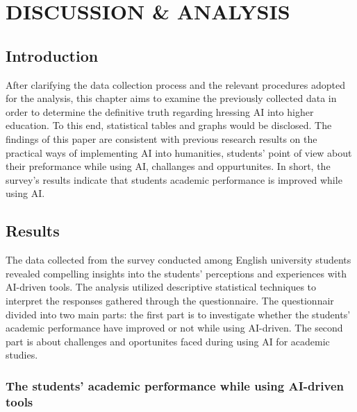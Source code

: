 \chapter{DISCUSSION \& ANALYSIS}
\section{Introduction}
After clarifying the data collection process and the relevant procedures adopted for
the analysis, this chapter aims to examine the previously collected data in order to determine
the definitive truth regarding hressing AI into higher education. To this end, statistical
tables and graphs would be disclosed. The findings of this
paper are consistent with previous research results on the practical ways of implementing AI into
humanities, students' point of view about their preformance while using AI, challanges and oppurtunites.
In short, the survey’s results indicate that students academic performance is improved while using AI.
\section{Results}
The data collected from the survey conducted among English university students
revealed compelling insights into the students' perceptions and experiences with AI-driven tools.
The analysis utilized descriptive statistical techniques to interpret the responses gathered through the questionnaire.
The questionnair divided into two main parts: the first part is to investigate
whether the students' academic performance have improved or not while using AI-driven. The second
part is about challenges and oportunites faced during using AI for academic studies.

\subsection{The students' academic performance while using AI-driven tools}

\begin{figure}[h]
	\centering
\end{figure}

